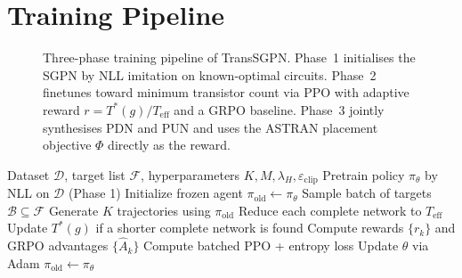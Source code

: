 \documentclass[letterpaper]{article}
\theoremstyle{plain}
\theoremstyle{definition}
\newcommand{\method}{TransSGPN}
\newcommand{\SGPN}{SGPN\xspace}
\begin{document}
\section{Training Pipeline}
\label{app:pipeline}

\begin{figure}[h]
\centering
\resizebox{\columnwidth}{!}{}
\caption{Three-phase training pipeline of \method.
Phase~1 initialises the \SGPN by NLL imitation on known-optimal circuits.
Phase~2 finetunes toward minimum transistor count via PPO with adaptive
reward $r = T^*(g)/T_{\mathrm{eff}}$ and a GRPO baseline.
Phase~3 jointly synthesises PDN and PUN and uses the ASTRAN placement
objective $\Phi$ directly as the reward.}
\label{fig:training}
\end{figure}

\begin{algorithm}[t]
\caption{\method{} / \SGPN Training (Phases 1--2)}
\label{alg:train}
\begin{algorithmic}[1]
\Require Dataset $\mathcal{D}$, target list $\mathcal{F}$,
         hyperparameters $K, M, \lambda_H, \varepsilon_{\mathrm{clip}}$
\State Pretrain policy $\pi_\theta$ by NLL on $\mathcal{D}$ (Phase 1)
\State Initialize frozen agent $\pi_{\mathrm{old}} \leftarrow \pi_\theta$
  \State Sample batch of targets $\mathcal{B} \subseteq \mathcal{F}$
    \State Generate $K$ trajectories using $\pi_{\mathrm{old}}$
    \State Reduce each complete network to $T_{\mathrm{eff}}$
    \State Update $T^*(g)$ if a shorter complete network is found
    \State Compute rewards $\{r_k\}$ and GRPO advantages $\{\hat{A}_k\}$
  \EndFor
  \State Compute batched PPO + entropy loss
  \State Update $\theta$ via Adam
   $\pi_{\mathrm{old}} \leftarrow \pi_\theta$ \EndIf
\EndFor
\end{algorithmic}
\end{algorithm}
\end{document}
